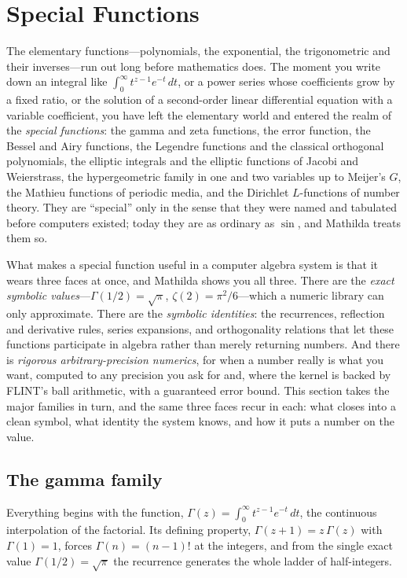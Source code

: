 \section{Special Functions}
\label{sec:specialfns}

The elementary functions---polynomials, the exponential, the trigonometric and
their inverses---run out long before mathematics does. The moment you write down
an integral like \(\int_0^\infty t^{z-1}e^{-t}\,dt\), or a power series whose
coefficients grow by a fixed ratio, or the solution of a second-order linear
differential equation with a variable coefficient, you have left the elementary
world and entered the realm of the \emph{special functions}: the gamma and zeta
functions, the error function, the Bessel and Airy functions, the Legendre
functions and the classical orthogonal polynomials, the elliptic integrals and the
elliptic functions of Jacobi and Weierstrass, the hypergeometric family in one and two
variables up to Meijer's \(G\), the Mathieu functions of periodic media, and the
Dirichlet \(L\)-functions of number theory. They are ``special'' only in
the sense that they were named and tabulated before computers existed; today they
are as ordinary as \(\sin\), and Mathilda treats them so.

What makes a special function useful in a computer algebra system is that it wears
three faces at once, and Mathilda shows you all three. There are the
\emph{exact symbolic values}---\(\Gamma(1/2)=\sqrt\pi\), \(\zeta(2)=\pi^2/6\)---which a
numeric library can only approximate. There are the \emph{symbolic identities}: the
recurrences, reflection and derivative rules, series expansions, and orthogonality
relations that let these functions participate in algebra rather than merely
returning numbers. And there is \emph{rigorous arbitrary-precision numerics}, for
when a number really is what you want, computed to any precision you ask for and,
where the kernel is backed by FLINT's ball arithmetic, with a guaranteed error
bound. This section takes the major families in turn, and the same three faces
recur in each: what closes into a clean symbol, what identity the system knows, and
how it puts a number on the value.

\subsection{The gamma family}
\label{ssec:sf-gamma}

Everything begins with the  function, \(\Gamma(z)=\int_0^\infty
t^{z-1}e^{-t}\,dt\), the continuous interpolation of the
factorial. Its defining property, \(\Gamma(z+1)=z\,\Gamma(z)\)
with \(\Gamma(1)=1\), forces \(\Gamma(n)=(n-1)!\) at the integers, and from the
single exact value \(\Gamma(1/2)=\sqrt\pi\) the recurrence generates the whole
ladder of half-integers.

